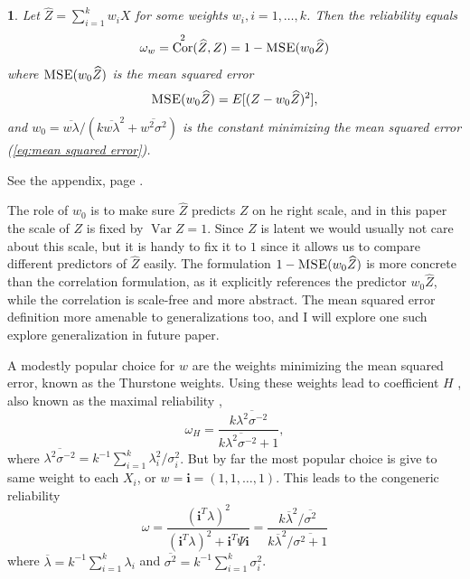 \documentclass{article}
\makeatletter
\theoremstyle{plain}
\theoremstyle{plain}
\theoremstyle{definition}
\theoremstyle{remark}
\theoremstyle{definition}
\theoremstyle{plain}
\theoremstyle{plain}
\newtheorem{prop}[thm]{\protect\propositionname}
\theoremstyle{definition}
\newenvironment{proof}[1][\protect\proofname]{\par
	\normalfont\topsep6\p@\@plus6\p@\relax
	\trivlist
	\itemindent\parindent
	\item[\hskip\labelsep\scshape #1]\ignorespaces
}{%
	\endtrivlist\@endpefalse
}
\providecommand{\proofname}{Proof}
\providecommand{\propositionname}{Proposition}
\DeclareMathOperator{\Var}{Var}
\DeclareMathOperator{\Cor}{Cor}
\makeatother
\begin{document}
\begin{prop}
\label{prop:reliability motivation}Let $\widehat{Z}=\sum_{i=1}^{k}w_{i}X$
for some weights $w_{i},i=1,\ldots,k$. Then the reliability equals
\[
\omega_w=\Cor^{2}(\widehat{Z},Z)=1-\textsc{MSE}(w_{0}\widehat{Z})
\]
where $\textsc{MSE}(w_{0}\widehat{Z})$ is the
mean squared error 
\begin{equation}
\textsc{MSE}(w_{0}\widehat{Z})=E[(Z-w_{0}\widehat{Z})^{2}],\label{eq:mean squared error}
\end{equation}
and $w_{0}=\overline{w\lambda}/(k\overline{w\lambda}^{2}+\overline{w^{2}\sigma^{2}})$
is the constant minimizing the mean squared error (\ref{eq:mean squared error}).
\end{prop}
\begin{proof}
See the appendix, page \pageref{proof:reliability motivation}.
\end{proof}

The role of $w_0$ is to make sure $\widehat{Z}$ predicts $Z$ on he right scale, and in this paper the scale of $Z$ is fixed by $\Var Z = 1$. Since $Z$ is latent we would usually not care about this scale, but it is handy to fix it to $1$ since it allows us to compare different predictors of $\widehat{Z}$ easily. The formulation $1-\textsc{MSE}(w_{0}\widehat{Z})$ is more concrete than the correlation formulation, as it explicitly references the predictor $w_{0}\widehat{Z}$, while the correlation is scale-free and more abstract. The mean squared error definition more amenable to generalizations too, and I will explore one such explore generalization in future paper. 

A modestly popular choice for $w$ are the weights minimizing the mean squared error, known as the Thurstone \citep{thurshronebook} weights. Using these weights lead to coefficient $H$ \citep{hancock2001rethinking}, also known as the maximal reliability \citep{Li1997-yh}, 
\begin{equation}
\label{eq:coefficient_H}
\omega_{H}=\frac{k\overline{\lambda^{2}\sigma^{-2}}}{k\overline{\lambda^{2}\sigma^{-2}}+1},
\end{equation}
where $\overline{\lambda^{2}\sigma^{-2}} = k^{-1}\sum_{i=1}^{k}\lambda_{i}^2/\sigma_i^2$. But by far the most popular choice is give to same weight to each $X_i$, or $w = \mathbf{i}=\left(1,1,\ldots,1\right)$. This leads to the congeneric reliability
\begin{equation}
\omega =\frac{(\mathbf{i}^T\lambda)^2}{(\mathbf{i}^T\lambda)^2 + \mathbf{i}^T\Psi\mathbf{i}} =\frac{k\overline{\lambda}^{2}/\overline{\sigma^{2}}}{k\overline{\lambda}^{2}/\overline{\sigma^{2} + 1}}\label{eq:Congeneric reliability}
\end{equation}
where $\overline{\lambda}=k^{-1}\sum_{i=1}^{k}\lambda_{i}$ and
$\overline{\sigma^{2}}=k^{-1}\sum_{i=1}^{k}\sigma_{i}^{2}$.
\end{document}
